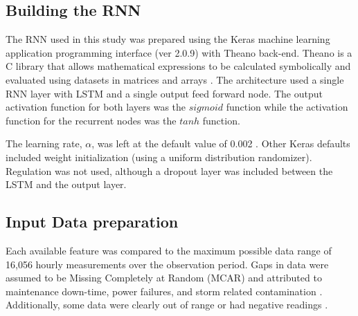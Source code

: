 \subsection{Building the RNN}
The RNN used in this study was prepared using the Keras machine learning application programming interface (ver 2.0.9) \citep{keras2015} with Theano back-end. Theano is a C\+\+ library that allows mathematical expressions to be calculated symbolically and evaluated using datasets in matrices and arrays \citep{Theano2016}. The architecture used a single RNN layer with LSTM and a single output feed forward node. The output activation function for both layers was the $sigmoid$ function while the activation function for the recurrent nodes was the $tanh$ function. 

The learning rate, $\alpha$, was left at the default value of 0.002 \citep{keras2015}. Other Keras defaults included weight initialization (using a uniform distribution randomizer). Regulation was not used, although a dropout layer was included between the LSTM and the output layer. 

\subsection{Input Data preparation}
Each available feature was compared to the maximum possible data range of 16,056 hourly measurements over the observation period. Gaps in data were assumed to be Missing Completely at Random (MCAR) and attributed to maintenance down-time, power failures, and storm related contamination \citep{Le2007}. Additionally, some data were clearly out of range or had negative readings \citep{Junger2015}.

